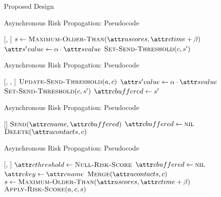 \documentclass[11pt]{beamer}
\begin{document}
\begin{section}{Proposed Design}
\begin{frame}{Asynchronous Risk Propagation: Pseudocode}
\begin{function}{\nUpdateSendThreshold}[\vActor, \vContact]
    \pause
      \pause
      \State $\vScore \assign \cMaximumOlderThan[\aActorScores, \aContactTime + \pTimeBuffer]$
        \pause
      \State $\aNewScoreValue \assign \pTransmissionRate \cdot \aScoreValue$
        \pause
      \State $\cSetSendThreshold[\vContact, \vNewScore]$
    \EndIf
  \EndIf
\end{function}
\end{frame}

\begin{frame}{Asynchronous Risk Propagation: Pseudocode}
\begin{function}{\nApplyRiskScore}[\vActor, \vContact, \vScore]
  \State $\cUpdateSendThreshold[\vActor, \vContact]$
  \pause
  \If{$\aContactThresholdValue < \aScoreValue \AND \aContactTime + \pTimeBuffer > \aScoreTime$}
    \pause
    \State $\aNewScoreValue \assign \pTransmissionRate \cdot \aScoreValue$
    \pause
    \State $\cSetSendThreshold[\vContact, \vNewScore]$
    \pause
    \State $\aContactBuffered \assign \vNewScore$
  \EndIf
\end{function}
\end{frame}

\begin{frame}{Asynchronous Risk Propagation: Pseudocode}
\begin{function}{\nHandleFlushTimeout}[\vActor]
  \ForEach{$\vContact \in \aActorContacts$}
    \pause
    \If{$\aContactBuffered \notEquals \nil$}
      \pause
      \State $\cSend[\aContactName, \aContactBuffered]$
      \pause
      \State $\aContactBuffered \assign \nil$
    \EndIf
    \pause
      \State $\cDelete[\aActorContacts, \vContact]$
    \EndIf
  \EndFor
\end{function}
\end{frame}

\begin{frame}{Asynchronous Risk Propagation: Pseudocode}
\begin{function}{\nHandleContact}[\vActor, \vContact]
    \pause
    \State $\aContactThreshold \assign \cNullRiskScore$
    \pause
    \State $\aContactBuffered \assign \nil$
    \pause
    \State $\aContactKey \assign \aContactName$
    \pause
    \State $\cMerge[\aActorContacts, \vContact]$
    \pause
    \State $\vScore \assign \cMaximumOlderThan[\aActorScores, \aContactTime + \pTimeBuffer]$
    \pause
    \State $\cApplyRiskScore[\vActor, \vContact, \vScore]$
  \EndIf
\end{function}
\end{frame}

\end{section}
\end{document}
